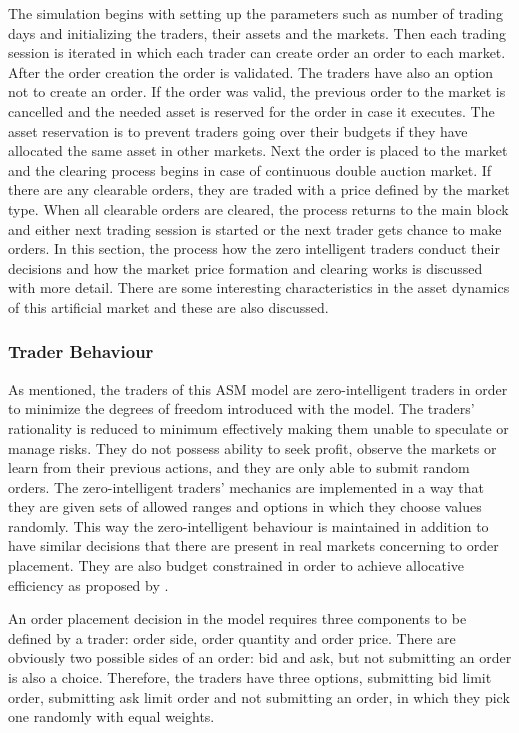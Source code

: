 The simulation begins with setting up the parameters such as number of
trading days and initializing the traders, their assets and the markets.
Then each trading session is iterated in which each trader can create order 
an order to each market. After the order creation the order is validated.
The traders have also an option not to create an order. If the order was
valid, the previous order to the market is cancelled and the needed 
asset is reserved for the order in case it executes. The asset
reservation is to prevent traders going over their budgets if they
have allocated the same asset in other markets. Next the order is
placed to the market and the clearing process begins in case of 
continuous double auction market. If there are any clearable orders,
they are traded with a price defined by the market type. When
all clearable orders are cleared, the process returns to the
main block and either next trading session is started or the next
trader gets chance to make orders. In this section, the process how the
zero intelligent traders conduct their decisions and how the 
market price formation and clearing works is discussed with more detail.
There are some interesting characteristics in the asset dynamics of this
artificial market and these are also discussed.

\subsubsection{Trader Behaviour}

As mentioned, the traders of this ASM model are zero-intelligent
traders in order to minimize the degrees of freedom introduced with
the model. The traders' rationality is reduced to minimum effectively
making them unable to speculate or manage risks. They do not
possess ability to seek profit, observe the markets or learn
from their previous actions, and they are only able to submit random orders. 
The zero-intelligent traders' mechanics are implemented in a way that
they are given sets of allowed ranges and options in which they choose
values randomly. This way the zero-intelligent behaviour is maintained
in addition to have similar decisions that there are present in real markets 
concerning to order placement. They are also budget constrained
in order to achieve allocative efficiency as proposed by
\citet{God93}.

An order placement decision in the model requires three components 
to be defined by a trader: order side, order quantity and order price. 
There are obviously two possible sides of an order: bid and ask, but
not submitting an order is also a choice. Therefore, the traders
have three options, submitting bid limit order, submitting ask limit order
and not submitting an order, in which they pick one randomly with equal
weights. 

